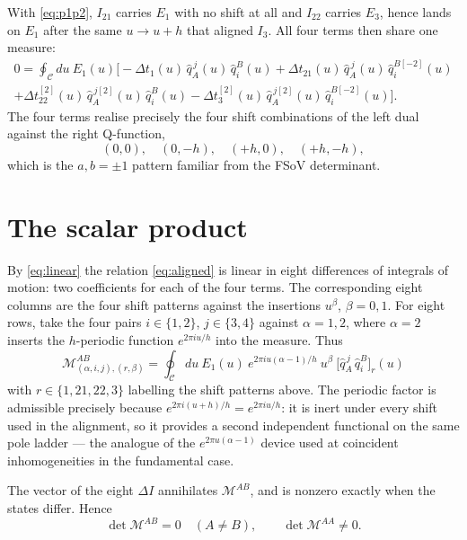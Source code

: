 \documentclass[11pt]{article}
\newcommand{\Cc}{\mathcal{C}}
\newcommand{\Mm}{\mathcal{M}}
\newcommand{\qh}{\hat q}
\newcommand{\shift}[1]{^{[#1]}}
\begin{document}
With \eqref{eq:p1p2}, $I_{21}$ carries $E_1$ with no shift at all and $I_{22}$ carries $E_3$, hence
lands on $E_1$ after the same $u\to u+h$ that aligned $I_3$. All four terms then share one measure:
\begin{multline}
0 = \oint_{\Cc} du\ E_1(u)\Big[
 -\Delta t_1(u)\,\qh^{\,j}_A(u)\,\qh^B_i(u)
 +\Delta t_{21}(u)\,\qh^{\,j}_A(u)\,\qh^{B[-2]}_i(u) \\
 +\Delta t_{22}\shift{2}(u)\,\qh^{\,j[2]}_A(u)\,\qh^B_i(u)
 -\Delta t_3\shift{2}(u)\,\qh^{\,j[2]}_A(u)\,\qh^{B[-2]}_i(u)\Big] .
\label{eq:aligned}
\end{multline}
The four terms realise precisely the four shift combinations of the left dual against the right
Q-function,
\begin{equation}
(0,0),\quad (0,-h),\quad (+h,0),\quad (+h,-h) ,
\end{equation}
which is the $a,b=\pm 1$ pattern familiar from the FSoV determinant.

\section{The scalar product}

By \eqref{eq:linear} the relation \eqref{eq:aligned} is linear in eight differences of integrals of
motion: two coefficients for each of the four terms. The corresponding eight columns are the four
shift patterns against the insertions $u^\beta$, $\beta=0,1$. For eight rows, take the four pairs
$i\in\{1,2\}$, $j\in\{3,4\}$ against $\alpha=1,2$, where $\alpha=2$ inserts the $h$-periodic
function $e^{2\pi i u/h}$ into the measure. Thus
\begin{equation}
\boxed{\;
\Mm^{AB}_{(\alpha,i,j),(r,\beta)} = \oint_{\Cc} du\ E_1(u)\ e^{2\pi i u(\alpha-1)/h}\ u^\beta\
\big[\qh^{\,j}_A\,\qh^B_i\big]_r(u) \;}
\label{eq:M}
\end{equation}
with $r \in \{1,21,22,3\}$ labelling the shift patterns above. The periodic factor is admissible
precisely because $e^{2\pi i(u+h)/h} = e^{2\pi i u/h}$: it is inert under every shift used in the
alignment, so it provides a second independent functional on the same pole ladder --- the analogue
of the $e^{2\pi u(\alpha-1)}$ device used at coincident inhomogeneities in the fundamental case.

The vector of the eight $\Delta I$ annihilates $\Mm^{AB}$, and is nonzero exactly when the states
differ. Hence
\begin{equation}
\det \Mm^{AB} = 0 \quad (A\neq B) , \qquad \det \Mm^{AA} \neq 0 .
\label{eq:orthogonality}
\end{equation}
\end{document}
